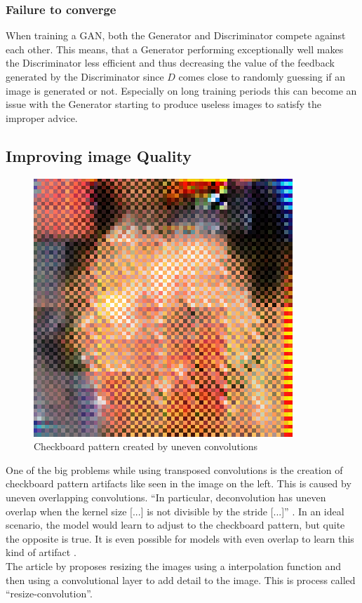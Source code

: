 \documentclass{article}
\begin{document}
\subsubsection{Failure to converge}
When training a GAN, both the Generator and Discriminator compete against each other. This means, that a Generator performing exceptionally well makes the Discriminator less efficient and thus decreasing the value of the feedback generated by the Discriminator since $D$ comes close to randomly guessing if an image is generated or not. Especially on long training periods this can become an issue with the Generator starting to produce useless images to satisfy the improper advice.

\subsection{Improving image Quality}
\label{ref:image_quality}
\begin{figure}
    \includegraphics[width=.4\textwidth]{images/checkbord_image.png}
    \caption{Checkboard pattern created by uneven convolutions}
\end{figure}
One of the big problems while using transposed convolutions is the creation of checkboard pattern artifacts like seen in the image on the left. This is caused by uneven overlapping convolutions. ``In particular, deconvolution has uneven overlap when the kernel size [...] is not divisible by the stride [...]'' \autocite{odena2016deconvolution}.
In an ideal scenario, the model would learn to adjust to the checkboard pattern, but quite the opposite is true. It is even possible for models with even overlap to learn this kind of artifact \autocite{odena2016deconvolution}.\\
The article by \citeauthor{odena2016deconvolution} \autocite*{odena2016deconvolution} proposes resizing the images using a interpolation function and then using a convolutional layer to add detail to the image. This is process called ``resize-convolution''.
\end{document}
